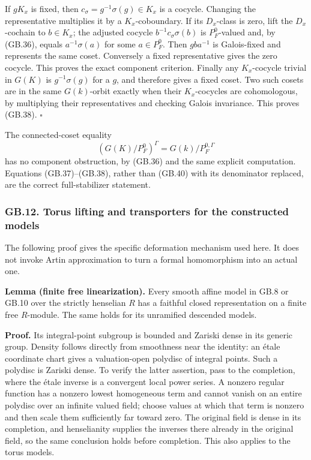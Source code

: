 \documentclass[
  11pt,
]{article}
\begin{document}
If \(gK_x\) is fixed, then \(c_\sigma=g^{-1}\sigma(g)\in K_x\) is a
cocycle. Changing the representative multiplies it by a
\(K_x\)-coboundary. If its \(D_x\)-class is zero, lift the
\(D_x\)-cochain to \(b\in K_x\); the adjusted cocycle
\(b^{-1}c_\sigma\sigma(b)\) is \(P_F^0\)-valued and, by (GB.36), equals
\(a^{-1}\sigma(a)\) for some \(a\in P_F^0\). Then \(gba^{-1}\) is
Galois-fixed and represents the same coset. Conversely a fixed
representative gives the zero cocycle. This proves the exact component
criterion. Finally any \(K_x\)-cocycle trivial in \(G(K)\) is
\(g^{-1}\sigma(g)\) for a \(g\), and therefore gives a fixed coset. Two
such cosets are in the same \(G(k)\)-orbit exactly when their
\(K_x\)-cocycles are cohomologous, by multiplying their representatives
and checking Galois invariance. This proves (GB.38). \(\square\)

The connected-coset equality \[
 (G(K)/P_F^0)^\Gamma=G(k)/P_F^{0,\Gamma}
 \tag{GB.40}
\] has no component obstruction, by (GB.36) and the same explicit
computation. Equations (GB.37)--(GB.38), rather than (GB.40) with its
denominator replaced, are the correct full-stabilizer statement.

\subsubsection{GB.12. Torus lifting and transporters for the constructed
models}\label{gb.12.-torus-lifting-and-transporters-for-the-constructed-models}

The following proof gives the specific deformation mechanism used here.
It does not invoke Artin approximation to turn a formal homomorphism
into an actual one.

\textbf{Lemma (finite free linearization).} Every smooth affine model in
GB.8 or GB.10 over the strictly henselian \(R\) has a faithful closed
representation on a finite free \(R\)-module. The same holds for its
unramified descended models.

\textbf{Proof.} Its integral-point subgroup is bounded and Zariski dense
in its generic group. Density follows directly from smoothness near the
identity: an étale coordinate chart gives a valuation-open polydisc of
integral points. Such a polydisc is Zariski dense. To verify the latter
assertion, pass to the completion, where the étale inverse is a
convergent local power series. A nonzero regular function has a nonzero
lowest homogeneous term and cannot vanish on an entire polydisc over an
infinite valued field; choose values at which that term is nonzero and
then scale them sufficiently far toward zero. The original field is
dense in its completion, and henselianity supplies the inverses there
already in the original field, so the same conclusion holds before
completion. This also applies to the torus models.
\end{document}
